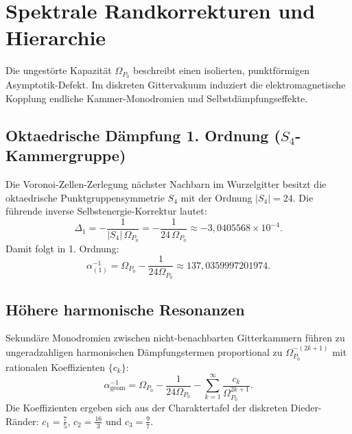 \documentclass[11pt,a4paper]{article}
\begin{document}
\section{Spektrale Randkorrekturen und Hierarchie}\label{sec:corrections}
Die ungestörte Kapazität $\Omega_{P_0}$ beschreibt einen isolierten, punktförmigen Asymptotik-Defekt. Im diskreten Gittervakuum induziert die elektromagnetische Kopplung endliche Kammer-Monodromien und Selbstdämpfungseffekte.

\subsection{Oktaedrische Dämpfung 1. Ordnung (\texorpdfstring{$S_4$}{S4}-Kammergruppe)}
Die Voronoi-Zellen-Zerlegung nächster Nachbarn im Wurzelgitter besitzt die oktaedrische Punktgruppensymmetrie $S_4$ mit der Ordnung $|S_4| = 24$. Die führende inverse Selbstenergie-Korrektur lautet:
\begin{equation}
\Delta_1 = -\frac{1}{|S_4|\,\Omega_{P_0}} = -\frac{1}{24\,\Omega_{P_0}} \approx -3{,}0405568 \times 10^{-4}.
\end{equation}
Damit folgt in 1. Ordnung:
\begin{equation}
\alpha_{(1)}^{-1} = \Omega_{P_0} - \frac{1}{24\Omega_{P_0}} \approx 137{,}0359997201974.
\end{equation}

\subsection{Höhere harmonische Resonanzen}
Sekundäre Monodromien zwischen nicht-benachbarten Gitterkammern führen zu ungeradzahligen harmonischen Dämpfungstermen proportional zu $\Omega_{P_0}^{-(2k+1)}$ mit rationalen Koeffizienten $\{c_k\}$:
\begin{equation}
\alpha_{\text{geom}}^{-1} = \Omega_{P_0} - \frac{1}{24\Omega_{P_0}} - \sum_{k=1}^{\infty} \frac{c_k}{\Omega_{P_0}^{2k+1}}.
\end{equation}
Die Koeffizienten ergeben sich aus der Charaktertafel der diskreten Dieder-Ränder: $c_1 = \frac{7}{5}$, $c_2 = \frac{16}{3}$ und $c_3 = \frac{9}{7}$.
\end{document}
